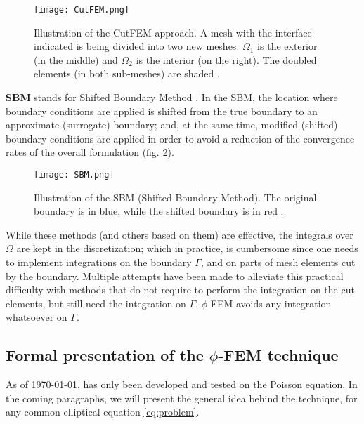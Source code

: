 \begin{figure}[H]
    \centering
    \texttt{[image: CutFEM.png]}
    \caption{Illustration of the CutFEM approach. A mesh with the interface indicated is being divided into two new meshes. $\Omega_1$ is the exterior (in the middle) and $\Omega_2$ is the interior (on the right). The doubled elements (in both sub-meshes) are shaded \parencite{burman2015cutfem}.}
    \label{fig:CutFEM}
\end{figure}


\textbf{SBM} stands for Shifted Boundary Method \parencite{atallah2020analysis}. In the SBM, the location where boundary conditions are applied is shifted from the true boundary to an approximate (surrogate) boundary; and, at the same time, modified (shifted) boundary conditions
are applied in order to avoid a reduction of the convergence rates of the overall formulation (fig. \ref{fig:SBM}).

\begin{figure}[H]
    \centering
    \texttt{[image: SBM.png]}
    \caption{Illustration of the SBM (Shifted Boundary Method). The original boundary is in blue, while the shifted boundary is in red \parencite{atallah2020analysis}.}
    \label{fig:SBM}
\end{figure}


While these methods (and others based on them) are effective, the integrals over $\Omega$ are kept in the discretization; which in practice, is cumbersome since one needs to implement integrations on the boundary $\Gamma$, and on parts of mesh elements cut by the boundary. Multiple attempts have been made to alleviate this practical difficulty with methods that do not require to perform the
integration on the cut elements, but still need the integration on $\Gamma$. $\phi$-FEM avoids any integration whatsoever on $\Gamma$.


\subsection{Formal presentation of the $\phi$-FEM technique}

As of \today, \phifem has only been developed and tested on the Poisson equation. In the coming paragraphs, we will present the general idea behind the technique, for any common elliptical equation \eqref{eq:problem}. 

